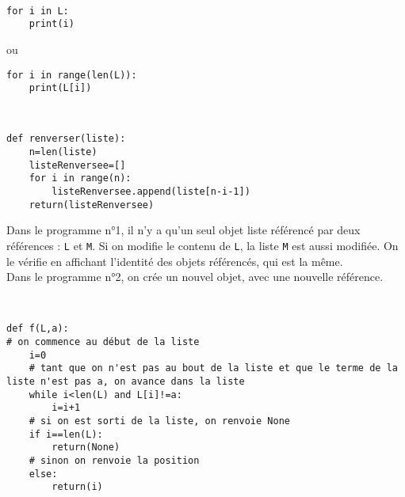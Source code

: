 \begin{solution}~\\
\vspace{-0.7cm}
\begin{verbatim}
for i in L:
    print(i)
\end{verbatim}
ou 
\begin{verbatim}
for i in range(len(L)):
	print(L[i])
\end{verbatim}
\end{solution}



\begin{solution}~\\
\vspace{-0.7cm}
\begin{verbatim}
def renverser(liste):
    n=len(liste)
    listeRenversee=[]
    for i in range(n):
        listeRenversee.append(liste[n-i-1])
    return(listeRenversee)  
\end{verbatim}
\end{solution}


\begin{solution}
Dans le programme n°1, il n'y a qu’un seul objet liste référencé par deux références : \verb?L? et \verb?M?. Si on modifie le contenu de \verb?L?, la liste \verb?M? est aussi modifiée. On le vérifie en affichant l'identité des objets référencés, qui est la même.\\
Dans le programme n°2, on crée un nouvel objet, avec une nouvelle référence.
\end{solution}


\begin{solution}~\\
\vspace{-0.7cm}
\begin{verbatim}
def f(L,a):
# on commence au début de la liste
    i=0         
    # tant que on n'est pas au bout de la liste et que le terme de la liste n'est pas a, on avance dans la liste
    while i<len(L) and L[i]!=a:
        i=i+1
    # si on est sorti de la liste, on renvoie None    
    if i==len(L):
        return(None)
    # sinon on renvoie la position    
    else:
        return(i)                    
\end{verbatim}
\end{solution}



